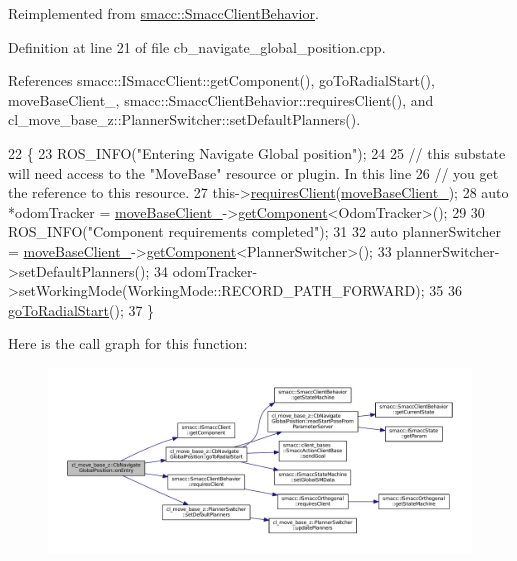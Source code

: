 Reimplemented from \hyperlink{classsmacc_1_1SmaccClientBehavior_a7962382f93987c720ad432fef55b123f}{smacc\+::\+Smacc\+Client\+Behavior}.



Definition at line 21 of file cb\+\_\+navigate\+\_\+global\+\_\+position.\+cpp.



References smacc\+::\+I\+Smacc\+Client\+::get\+Component(), go\+To\+Radial\+Start(), move\+Base\+Client\+\_\+, smacc\+::\+Smacc\+Client\+Behavior\+::requires\+Client(), and cl\+\_\+move\+\_\+base\+\_\+z\+::\+Planner\+Switcher\+::set\+Default\+Planners().


\begin{DoxyCode}
22 \{
23     ROS\_INFO(\textcolor{stringliteral}{"Entering Navigate Global position"});
24 
25     \textcolor{comment}{// this substate will need access to the "MoveBase" resource or plugin. In this line}
26     \textcolor{comment}{// you get the reference to this resource.}
27     this->\hyperlink{classsmacc_1_1SmaccClientBehavior_a917f001e763a1059af337bf4e164f542}{requiresClient}(\hyperlink{classcl__move__base__z_1_1CbNavigateGlobalPosition_a460d6b43834cb52baa94d22cd3a6fd2b}{moveBaseClient\_});
28     \textcolor{keyword}{auto} *odomTracker = \hyperlink{classcl__move__base__z_1_1CbNavigateGlobalPosition_a460d6b43834cb52baa94d22cd3a6fd2b}{moveBaseClient\_}->\hyperlink{classsmacc_1_1ISmaccClient_adef78db601749ca63c19e74a27cb88cc}{getComponent}<OdomTracker>();
29 
30     ROS\_INFO(\textcolor{stringliteral}{"Component requirements completed"});
31 
32     \textcolor{keyword}{auto} plannerSwitcher = \hyperlink{classcl__move__base__z_1_1CbNavigateGlobalPosition_a460d6b43834cb52baa94d22cd3a6fd2b}{moveBaseClient\_}->\hyperlink{classsmacc_1_1ISmaccClient_adef78db601749ca63c19e74a27cb88cc}{getComponent}<PlannerSwitcher>();
33     plannerSwitcher->setDefaultPlanners();
34     odomTracker->setWorkingMode(WorkingMode::RECORD\_PATH\_FORWARD);
35 
36     \hyperlink{classcl__move__base__z_1_1CbNavigateGlobalPosition_a489aaab9282dea9253fcf6b02e5f8aa4}{goToRadialStart}();
37 \}
\end{DoxyCode}


Here is the call graph for this function\+:
\nopagebreak
\begin{figure}[H]
\begin{center}
\leavevmode
\includegraphics[width=350pt]{classcl__move__base__z_1_1CbNavigateGlobalPosition_a66d8b0555ef2945bc108dcd5171be292_cgraph}
\end{center}
\end{figure}


